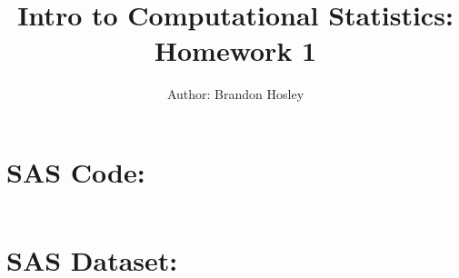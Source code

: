 \documentclass[a4paper,man,natbib]{apa6}
\title{Intro to Computational Statistics: Homework 1}
\author{Author: Brandon Hosley}
\affiliation{Instructor: Liang Kong, Ph.D}
\begin{document}
	\maketitle
	
	\section{SAS Code:}
	\singlespacing
	\inputminted{sas}{./DAT502-HW1.sas}
	\clearpage
	
	\section{SAS Dataset:}
\end{document}
